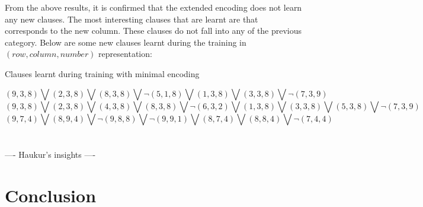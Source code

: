 \documentclass{article}
\begin{document}
From the above results, it is confirmed that the extended encoding does not learn any new clauses. The most interesting clauses that are learnt are that corresponds to the new column. These clauses do not fall into any of the previous category. Below are some new clauses learnt during the training in $(row, column, number)$ representation:

\begin{center}
Clauses learnt during training with minimal encoding 
\end{center}
\[(9, 3, 8 ) \bigvee (2, 3, 8 ) \bigvee (8, 3, 8 ) \bigvee \neg (5, 1, 8 ) \bigvee (1, 3, 8 ) \bigvee (3, 3, 8 ) \bigvee \neg (7, 3, 9 ) \]
\[(9, 3, 8) \bigvee (2, 3, 8) \bigvee (4, 3, 8) \bigvee (8, 3, 8) \bigvee \neg (6, 3, 2) \bigvee (1, 3, 8) \bigvee (3, 3, 8) \bigvee (5, 3, 8) \bigvee \neg (7, 3, 9)\]
\[(9, 7, 4) \bigvee (8, 9, 4) \bigvee \neg (9, 8, 8) \bigvee \neg (9, 9, 1) \bigvee (8, 7, 4) \bigvee (8, 8, 4) \bigvee \neg (7, 4, 4)\] \\\\


---- Haukur's insights ----

\section{Conclusion} \label{conclusion}




\end{document}
